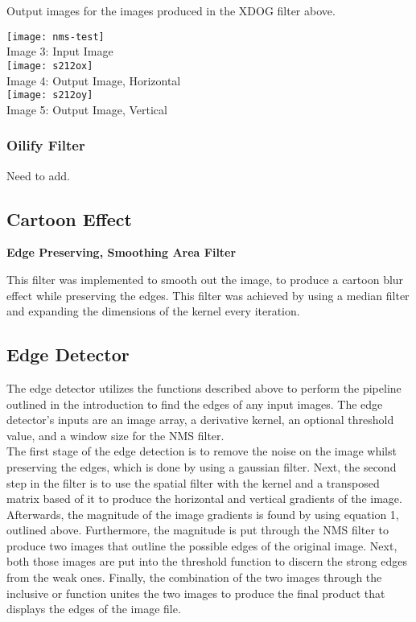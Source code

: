 \documentclass{article}
\begin{document}
	Output images for the images produced in the XDOG filter above.\\
	
	\begin{center}
		\noindent \texttt{[image: nms-test]}\\
		Image 3: Input Image\\
		
		\texttt{[image: s212ox]}\\
		Image 4: Output Image, Horizontal\\
		
		\texttt{[image: s212oy]}\\
		Image 5: Output Image, Vertical\\
	\end{center}
	
	\subsubsection{Oilify Filter}
	
	Need to add.
	
	\subsection{Cartoon Effect}
	
	\smallskip
	
	\textbf{Edge Preserving, Smoothing Area Filter}
	
	This filter was implemented to smooth out the image, to produce a cartoon blur effect while preserving the edges. This filter was achieved by using a median filter and expanding the dimensions of the kernel every iteration.\\
	
	
	
	\subsection{Edge Detector}
	
	The edge detector utilizes the functions described above to perform the pipeline outlined in the introduction to find the edges of any input images. The edge detector's inputs are an image array, a derivative kernel, an optional threshold value, and a window size for the NMS filter. \\
	
	The first stage of the edge detection is to remove the noise on the image whilst preserving the edges, which is done by using a gaussian filter. Next, the second step in the filter is to use the spatial filter with the kernel and a transposed matrix based of it to produce the horizontal and vertical gradients of the image. Afterwards, the magnitude of the image gradients is found by using equation 1, outlined above. Furthermore, the magnitude is put through the NMS filter to produce two images that outline the possible edges of the original image. Next, both those images are put into the threshold function to discern the strong edges from the weak ones. Finally, the combination of the two images through the inclusive or function unites the two images to produce the final product that displays the edges of the image file.\\
	
\end{document}

